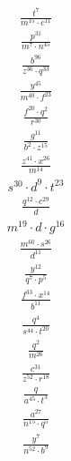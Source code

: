 \begin{align}
\frac{t^{7}}{m^{15}\cdot c^{11}}
\end{align}
\begin{align}
\frac{p^{31}}{m^{7}\cdot n^{45}}
\end{align}
\begin{align}
\frac{b^{96}}{z^{36}\cdot q^{33}}
\end{align}
\begin{align}
\frac{y^{45}}{m^{40}\cdot f^{23}}
\end{align}
\begin{align}
\frac{f^{20}\cdot q^{2}}{r^{30}}
\end{align}
\begin{align}
\frac{g^{11}}{b^{2}\cdot z^{15}}
\end{align}
\begin{align}
\frac{z^{41}\cdot x^{26}}{m^{14}}
\end{align}
\begin{align}
s^{30}\cdot d^{9}\cdot t^{23}
\end{align}
\begin{align}
\frac{q^{12}\cdot c^{29}}{d}
\end{align}
\begin{align}
m^{19}\cdot d\cdot g^{16}
\end{align}
\begin{align}
\frac{m^{60}\cdot s^{26}}{d^{11}}
\end{align}
\begin{align}
\frac{y^{12}}{q^{7}\cdot p^{5}}
\end{align}
\begin{align}
\frac{f^{33}\cdot x^{14}}{b^{11}}
\end{align}
\begin{align}
\frac{q^{4}}{s^{44}\cdot t^{20}}
\end{align}
\begin{align}
\frac{q^{2}}{m^{26}}
\end{align}
\begin{align}
\frac{c^{31}}{z^{52}\cdot r^{18}}
\end{align}
\begin{align}
\frac{q}{a^{45}\cdot t^{3}}
\end{align}
\begin{align}
\frac{a^{27}}{n^{15}\cdot q^{5}}
\end{align}
\begin{align}
\frac{y^{7}}{n^{52}\cdot b^{9}}
\end{align}
